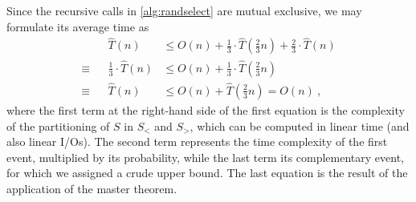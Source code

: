 \begin{enumerate}
\begin{itemize}
  \end{itemize}
  Since the recursive calls in \autoref{alg:randselect} are mutual exclusive, we
  may formulate its average time as
  \begin{align*}
    && && &&        && \widehat{T}(n) &\le O(n) + \frac{1}{3}\cdot\widehat{T}\left(\frac{2}{3}n\right) + \frac{2}{3}\cdot\widehat{T}\left(n\right) && && && \\
    && && && \equiv && \frac{1}{3}\cdot\widehat{T}\left(n\right) &\le O(n) + \frac{1}{3}\cdot\widehat{T}\left(\frac{2}{3}n\right) && && && \\
    && && && \equiv && \widehat{T}\left(n\right) &\le O(n) + \widehat{T}\left(\frac{2}{3}n\right) = O(n)\ ,&& && &&
  \end{align*}
  where the first term at the right-hand side of the first equation is the
  complexity of the partitioning of $S$ in $S_<$ and $S_>$, which can be
  computed in linear time (and also linear I/Os). The second term represents the
  time complexity of the first event, multiplied by its probability, while the
  last term its complementary event, for which we assigned a crude upper bound.
  The last equation is the result of the application of the master theorem.

\end{enumerate}
